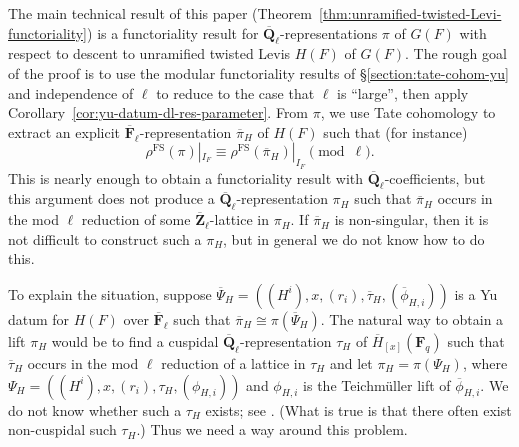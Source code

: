 \documentclass[reqno]{amsart}
\numberwithin{equation}{subsection}
\newcommand{\F}{\mathbf{F}}
\newcommand{\Q}{\mathbf{Q}}
\newcommand{\Z}{\mathbf{Z}}
\newcommand{\ol}[1]{\overline{#1}}
\DeclareMathOperator{\FS}{FS}
\theoremstyle{remark}
\numberwithin{equation}{subsection}
\numberwithin{figure}{subsection}
\begin{document}
The main technical result of this paper (Theorem~\ref{thm:unramified-twisted-Levi-functoriality}) is a functoriality result for $\ol\Q_\ell$-representations $\pi$ of $G(F)$ with respect to descent to unramified twisted Levis $H(F)$ of $G(F)$. The rough goal of the proof is to use the modular functoriality results of \S\ref{section:tate-cohom-yu} and independence of $\ell$ \cite[Theorem 1.1]{Sch25} to reduce to the case that $\ell$ is ``large'', then apply Corollary~\ref{cor:yu-datum-dl-res-parameter}. From $\pi$, we use Tate cohomology to extract an explicit $\ol\F_\ell$-representation $\ol\pi_H$ of $H(F)$ such that (for instance)
\[
\rho^{\FS}(\pi)|_{I_F} \equiv \rho^{\FS}(\ol\pi_H)|_{I_F} \pmod{\ell}.
\]
This is nearly enough to obtain a functoriality result with $\ol\Q_\ell$-coefficients, but this argument does not produce a $\ol\Q_\ell$-representation $\pi_H$ such that $\ol\pi_H$ occurs in the mod $\ell$ reduction of some $\ol\Z_\ell$-lattice in $\pi_H$. If $\ol\pi_H$ is non-singular, then it is not difficult to construct such a $\pi_H$, but in general we do not know how to do this.

To explain the situation, suppose $\ol\Psi_H = ((H^i), x, (r_i), \ol\tau_H, (\ol\phi_{H,i}))$ is a Yu datum for $H(F)$ over $\ol\F_\ell$ such that $\ol\pi_H \cong \pi(\ol\Psi_H)$. The natural way to obtain a lift $\pi_H$ would be to find a cuspidal $\ol\Q_\ell$-representation $\tau_H$ of $\ol H_{[x]}(\F_q)$ such that $\ol\tau_H$ occurs in the mod $\ell$ reduction of a lattice in $\tau_H$ and let $\pi_H = \pi(\Psi_H)$, where $\Psi_H = ((H^i), x, (r_i), \tau_H, (\phi_{H,i}))$ and $\phi_{H,i}$ is the Teichm\"uller lift of $\ol\phi_{H,i}$. We do not know whether such a $\tau_H$ exists; see \cite[Question~2.10.4]{Cot26b}. (What is true is that there often exist non-cuspidal such $\tau_H$.) Thus we need a way around this problem.
\end{document}
